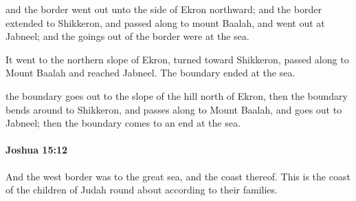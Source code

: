 			\begin{versebox}
					\item[BHS] 
					\item[ASV] and the border went out unto the side of Ekron northward; and the border extended to Shikkeron, and passed along to mount Baalah, and went out at Jabneel; and the goings out of the border were at the sea.
					\item[NIV] It went to the northern slope of Ekron, turned toward Shikkeron, passed along to Mount Baalah and reached Jabneel. The boundary ended at the sea.
					\item[NRSV] the boundary goes out to the slope of the hill north of Ekron, then the boundary bends around to Shikkeron, and passes along to Mount Baalah, and goes out to Jabneel; then the boundary comes to an end at the sea.
			\end{versebox}

		\paragraph{Joshua 15:12} %
			\label{JOSHUA-15-12}

			And the west border was to the great sea, and the coast thereof. This is the coast of the children of Judah round about according to their families.

